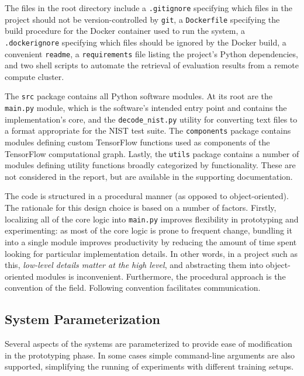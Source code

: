 \documentclass[12pt, titlepage]{report}
\theoremstyle{definition}
\begin{document}
The files in the root directory include a \texttt{.gitignore} specifying which files in the project should not be version-controlled by \texttt{git}, a \texttt{Dockerfile} specifying the build procedure for the Docker container used to run the system, a \texttt{.dockerignore} specifying which files should be ignored by the Docker build, a convenient \texttt{readme}, a \texttt{requirements} file listing the project's Python dependencies, and two shell scripts to automate the retrieval of evaluation results from a remote compute cluster.

The \texttt{src} package contains all Python software modules. At its root are the \texttt{main.py} module, which is the software's intended entry point and contains the implementation's core, and the \texttt{decode_nist.py} utility for converting text files to a format appropriate for the NIST test suite. The \texttt{components} package contains modules defining custom TensorFlow functions used as components of the TensorFlow computational graph. Lastly, the \texttt{utils} package contains a number of modules defining utility functions broadly categorized by functionality. These are not considered in the report, but are available in the supporting documentation.

The code is structured in a procedural manner (as opposed to object-oriented). The rationale for this design choice is based on a number of factors. Firstly, localizing all of the core logic into \texttt{main.py} improves flexibility in prototyping and experimenting: as most of the core logic is prone to frequent change, bundling it into a single module improves productivity by reducing the amount of time spent looking for particular implementation details. In other words, in a project such as this, \emph{low-level details matter at the high level}, and abstracting them into object-oriented modules is inconvenient. Furthermore, the procedural approach is the convention of the field. Following convention facilitates communication.



\subsection{System Parameterization}
Several aspects of the systems are parameterized to provide ease of modification in the prototyping phase. In some cases simple command-line arguments are also supported, simplifying the running of experiments with different training setups. 
\end{document}
